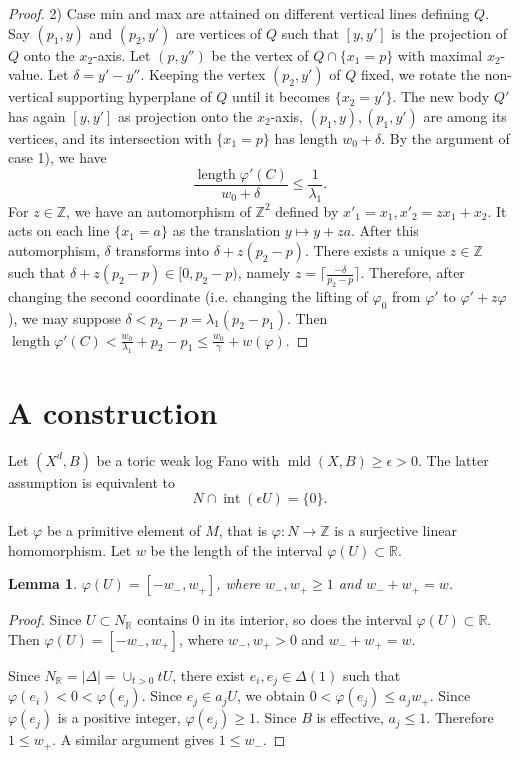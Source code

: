 \documentclass[12pt,twoside]{amsart}
\newcommand{\Z}{{\mathbb Z}}
\newcommand{\R}{{\mathbb R}}
\newcommand{\Int}{\operatorname{int}}
\newcommand{\length}{\operatorname{length}}
\newcommand{\mld}{\operatorname{mld}}
\theoremstyle{plain}
\newtheorem{lem}[thm]{Lemma}
\theoremstyle{definition}
\theoremstyle{remark}
\begin{document}
\begin{proof}
	2) Case min and max are attained on different vertical lines defining $Q$. Say $(p_1,y)$ and $(p_2,y')$ are vertices of $Q$ such that $[y,y']$ is the projection of $Q$ onto the $x_2$-axis. Let $(p,y'')$ be the vertex of $Q\cap \{x_1=p\}$ with maximal $x_2$-value.	
	Let $\delta=y'-y''$. Keeping the vertex $(p_2,y')$ of $Q$ fixed, we rotate the non-vertical supporting hyperplane of $Q$ until it becomes $\{x_2=y'\}$. The new body $Q'$ has again $[y,y']$ as projection onto the $x_2$-axis, $(p_1,y),(p_1,y')$ are among its vertices, and its intersection with $\{x_1=p\}$ has length $w_0+\delta$. By the argument of case 1), we have 
	$$
	\frac{\length \varphi'(C)}{w_0+\delta}\le \frac{1}{\lambda_1}.
	$$ 	
	For $z\in \Z$, we have an automorphism of $\Z^2$ defined by $x'_1=x_1,x'_2=zx_1+x_2$. It acts on each line $\{x_1=a\}$ as the translation $y\mapsto y+za$.
	After this automorphism, $\delta$ transforms into $\delta+z(p_2-p)$.
	There exists a unique $z\in \Z$ such that $\delta+z(p_2-p)\in [0,p_2-p)$, namely 
	$z=\lceil \frac{-\delta}{p_2-p}\rceil$. Therefore, after changing the second coordinate
	(i.e. changing the lifting of $\varphi_0$ from $\varphi'$ to $\varphi'+z\varphi$), we may suppose $\delta<p_2-p=\lambda_1(p_2-p_1)$. Then
	$
	\length \varphi'(C) <\frac{w_0}{\lambda_1}+p_2-p_1\le \frac{w_0}{\gamma}+w(\varphi).
	$
\end{proof}



\section{A construction}


Let $(X^d,B)$ be a toric weak log Fano with $\mld(X,B)\ge \epsilon>0$. 
The latter assumption is equivalent to 
$$
N\cap \Int(\epsilon U)=\{0\}.
$$

Let $\varphi$ be a primitive element of $M$, that is $\varphi\colon N\to \Z$ is a surjective
linear homomorphism. Let $w$ be the length of the interval $\varphi(U) \subset \R$.

\begin{lem}\label{1w}
$\varphi(U)=[-w_-,w_+]$, where $w_-,w_+\ge 1$ and $w_-+w_+=w$.	
\end{lem}

\begin{proof} Since $U\subset N_\R$ contains $0$ in its interior, so does
	the interval $\varphi(U)\subset \R$. Then $\varphi(U)=[-w_-,w_+]$, where $w_-,w_+>0$ 
	and $w_-+w_+=w$.	

    Since $N_\R=|\Delta|=\cup_{t>0}tU$, there exist $e_i,e_j\in \Delta(1)$ such that 
    $\varphi(e_i)<0<\varphi(e_j)$. Since $e_j\in a_jU$, we obtain $0<\varphi(e_j)\le a_jw_+$.
    Since $\varphi(e_j)$ is a positive integer, $\varphi(e_j)\ge 1$. Since $B$ is effective,
    $a_j\le 1$. Therefore $1\le w_+$. A similar argument gives $1\le w_-$.
\end{proof}
\end{document}
